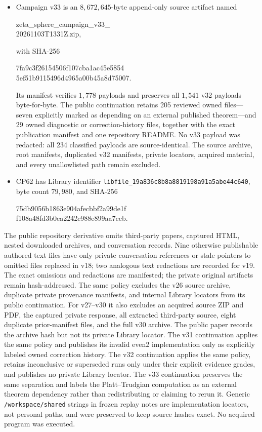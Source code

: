 \documentclass[11pt]{article}
\theoremstyle{definition}
\theoremstyle{remark}
\begin{document}
\begin{itemize}[leftmargin=2em]
the public v31 archive hash. The source archive, root manifests, duplicated
private v31 manifests, and every unlisted private or acquired path remain
excluded.
\item Campaign v33 is an $8{,}672{,}645$-byte append-only source artifact named
\begin{center}\small\ttfamily
zeta\_sphere\_campaign\_v33\_\\
20261103T1331Z.zip,
\end{center}
with SHA-256
\begin{center}\small\ttfamily
7fa9c3f26154506f107cba1ac45e5854\\
5ef51b9115496d4965a00b45a8d75007.
\end{center}
Its manifest verifies $1{,}778$ payloads and preserves all $1{,}541$ v32
payloads byte-for-byte.  The public continuation retains 205 reviewed owned
files---seven explicitly marked as depending on an external published
theorem---and 29 owned diagnostic or correction-history files, together with
the exact publication manifest and one repository README.  No v33 payload was
redacted: all 234 classified payloads are source-identical.  The source
archive, root manifests, duplicated v32 manifests, private locators, acquired
material, and every unallowlisted path remain excluded.
\item CP62 has Library identifier
{\small\texttt{libfile\_19a836c8b8a8819198a91a5abe44c640}}, byte count $79{,}980$,
and SHA-256
\begin{center}\small\ttfamily
75db9056b1863e904afecbbf2a99de1f\\
f108a48fd3b0ea2242c988e899aa7ccb.
\end{center}
\end{itemize}
The public repository derivative omits third-party papers, captured HTML,
nested downloaded archives, and conversation records. Nine otherwise
publishable authored text files have only private conversation references or
stale pointers to omitted files replaced in v18; two analogous text redactions
are recorded for v19. The exact omissions and redactions are manifested; the
private original artifacts remain hash-addressed. The same policy excludes the
v26 source archive, duplicate private provenance manifests, and internal
Library locators from its public continuation. For v27--v30 it also excludes an
acquired source ZIP and PDF, the captured private response, all extracted
third-party source, eight duplicate prior-manifest files, and the full v30
archive. The public paper records the archive hash but not its private Library
locator. The v31 continuation applies the same policy and publishes its invalid
even2 implementation only as explicitly labeled owned correction history. The
v32 continuation applies the same policy, retains inconclusive or superseded
runs only under their explicit evidence grades, and publishes no private
Library locator. The v33 continuation preserves the same separation and labels
the Platt--Trudgian computation as an external theorem dependency rather than
redistributing or claiming to rerun it. Generic
\texttt{/workspace/shared} strings in frozen replay notes are implementation
locators, not personal paths, and were preserved to keep source hashes exact.
No acquired program was executed.
\end{document}
